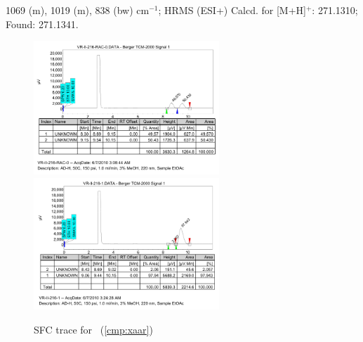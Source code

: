 1069 (m), 1019 (m), 838 (bw) cm$^{-1}$; HRMS (ESI+) Calcd. for 
[M+H]$^+$: 271.1310; Found: 271.1341.  \\
\begin{figure}[h]
\centering
\includegraphics[width=2.75in]{chp_asymmetric/images/sfc/xaar-rac.png}
\includegraphics[width=2.75in]{chp_asymmetric/images/sfc/xaar.png}
\caption{SFC trace for \CMPxaar~(\ref{cmp:xaar})}
\vspace{-10pt}
\end{figure}

